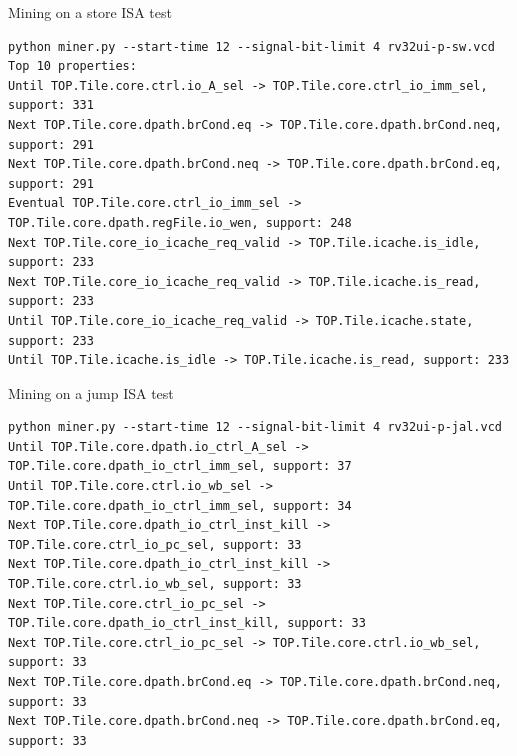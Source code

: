 \documentclass[12pt,aspectratio=169]{beamer}
\begin{document}
\begin{frame}[fragile]{Mining on a store ISA test}
  \begin{verbatim}
python miner.py --start-time 12 --signal-bit-limit 4 rv32ui-p-sw.vcd
Top 10 properties:
Until TOP.Tile.core.ctrl.io_A_sel -> TOP.Tile.core.ctrl_io_imm_sel, support: 331
Next TOP.Tile.core.dpath.brCond.eq -> TOP.Tile.core.dpath.brCond.neq, support: 291
Next TOP.Tile.core.dpath.brCond.neq -> TOP.Tile.core.dpath.brCond.eq, support: 291
Eventual TOP.Tile.core.ctrl_io_imm_sel -> TOP.Tile.core.dpath.regFile.io_wen, support: 248
Next TOP.Tile.core_io_icache_req_valid -> TOP.Tile.icache.is_idle, support: 233
Next TOP.Tile.core_io_icache_req_valid -> TOP.Tile.icache.is_read, support: 233
Until TOP.Tile.core_io_icache_req_valid -> TOP.Tile.icache.state, support: 233
Until TOP.Tile.icache.is_idle -> TOP.Tile.icache.is_read, support: 233
  \end{verbatim}
\end{frame}

\begin{frame}[fragile]{Mining on a jump ISA test}
  \begin{verbatim}
python miner.py --start-time 12 --signal-bit-limit 4 rv32ui-p-jal.vcd
Until TOP.Tile.core.dpath.io_ctrl_A_sel -> TOP.Tile.core.dpath_io_ctrl_imm_sel, support: 37
Until TOP.Tile.core.ctrl.io_wb_sel -> TOP.Tile.core.dpath_io_ctrl_imm_sel, support: 34
Next TOP.Tile.core.dpath_io_ctrl_inst_kill -> TOP.Tile.core.ctrl_io_pc_sel, support: 33
Next TOP.Tile.core.dpath_io_ctrl_inst_kill -> TOP.Tile.core.ctrl.io_wb_sel, support: 33
Next TOP.Tile.core.ctrl_io_pc_sel -> TOP.Tile.core.dpath_io_ctrl_inst_kill, support: 33
Next TOP.Tile.core.ctrl_io_pc_sel -> TOP.Tile.core.ctrl.io_wb_sel, support: 33
Next TOP.Tile.core.dpath.brCond.eq -> TOP.Tile.core.dpath.brCond.neq, support: 33
Next TOP.Tile.core.dpath.brCond.neq -> TOP.Tile.core.dpath.brCond.eq, support: 33
  \end{verbatim}
\end{frame}
\end{document}
